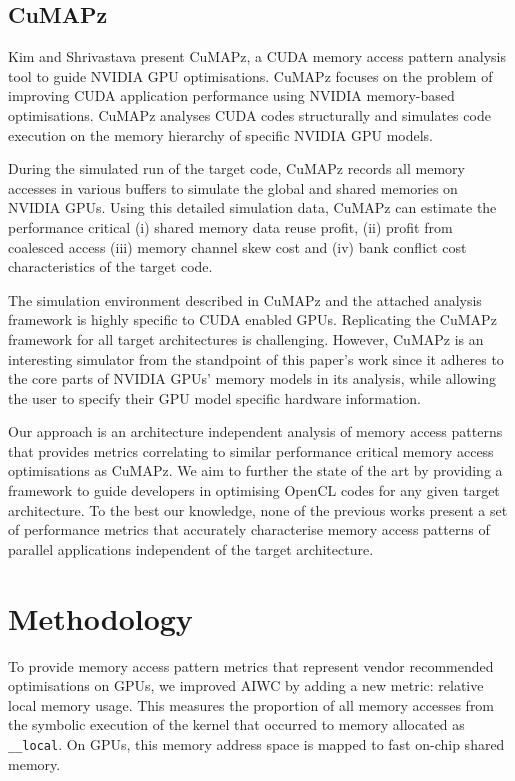 \documentclass[review=false, sigchi]{acmart}
\begin{document}
	\subsection{CuMAPz}
	
	Kim and Shrivastava \cite{kim2011cumapz} present CuMAPz, a CUDA memory access pattern analysis tool to guide NVIDIA GPU optimisations. CuMAPz focuses on the problem of improving CUDA application performance using NVIDIA memory-based optimisations. CuMAPz analyses CUDA codes structurally and simulates code execution on the memory hierarchy of specific NVIDIA GPU models.
	
	During the simulated run of the target code, CuMAPz records all memory accesses in various buffers to simulate the global and shared memories on NVIDIA GPUs. Using this detailed simulation data, CuMAPz can estimate the performance critical (i) shared memory data reuse profit, (ii) profit from coalesced access (iii) memory channel skew cost and (iv) bank conflict cost characteristics of the target code.
	
	The simulation environment described in CuMAPz and the attached analysis framework is highly specific to CUDA enabled GPUs. Replicating the CuMAPz framework for all target architectures is challenging. However, CuMAPz is an interesting simulator from the standpoint of this paper's work since it adheres to the core parts of NVIDIA GPUs' memory models in its analysis, while allowing the user to specify their GPU model specific hardware information.
	
	Our approach is an architecture independent analysis of memory access patterns that provides metrics correlating to similar performance critical memory access optimisations as CuMAPz. We aim to further the state of the art by providing a framework to guide developers in optimising OpenCL codes for any given target architecture. To the best our knowledge, none of the previous works present a set of performance metrics that accurately characterise memory access patterns of parallel applications independent of the target architecture.
	
	\section{Methodology} \label{method}
	
	To provide memory access pattern metrics that represent vendor recommended optimisations on GPUs, we improved AIWC by adding a new metric: relative local memory usage. This measures the proportion of all memory accesses from the symbolic execution of the kernel that occurred to memory allocated as \texttt{\_\_local}. On GPUs, this memory address space is mapped to fast on-chip shared memory.
	
\end{document}
